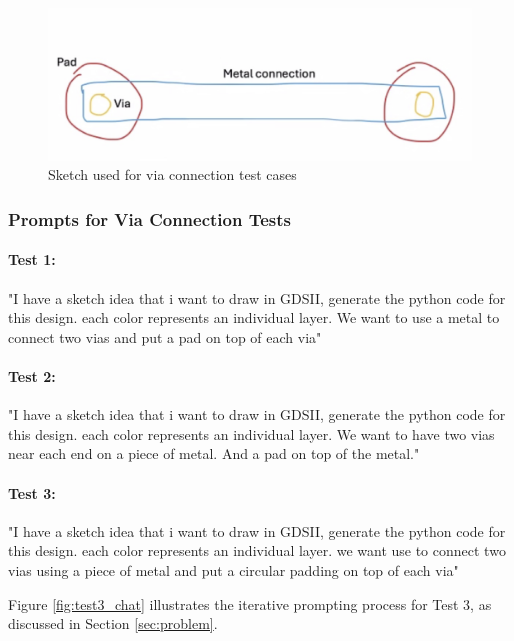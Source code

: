 \documentclass{article}
\begin{document}
\begin{figure}[ht]
\centering
\includegraphics[width=0.5\linewidth]{sketch.png}
\caption{Sketch used for via connection test cases}
\label{fig:sketch}
\end{figure}

\subsubsection{Prompts for Via Connection Tests}
\label{appendix:via_prompts}

\paragraph{Test 1:} "I have a sketch idea that i want to draw in GDSII, generate the python code for this design. each color represents an individual layer. We want to use a metal to connect two vias and put a pad on top of each via"

\paragraph{Test 2:} "I have a sketch idea that i want to draw in GDSII, generate the python code for this design. each color represents an individual layer. We want to have two vias near each end on a piece of metal. And a pad on top of the metal."

\paragraph{Test 3:} "I have a sketch idea that i want to draw in GDSII, generate the python code for this design. each color represents an individual layer. we want use to connect two vias using a piece of metal and put a circular padding on top of each via"

Figure \ref{fig:test3_chat} illustrates the iterative prompting process for Test 3, as discussed in Section \ref{sec:problem}.
\end{document}
